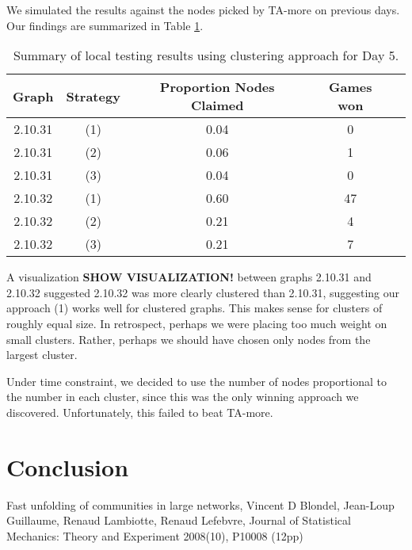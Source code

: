 \documentclass[letterpaper, 11pt]{article}
\begin{document}
We simulated the results against the nodes picked by TA-more on previous days. Our findings are summarized in Table \ref{table:day5}.
\begin{table}[h!]\centering
\begin{tabular}{ccccc}
Graph & Strategy & Proportion Nodes Claimed & Games won \\ \hline
\toprule
2.10.31 & (1) & 0.04 & 0 \\
2.10.31 & (2) & 0.06 & 1 \\
2.10.31 & (3) & 0.04 & 0 \\
\midrule

2.10.32 & (1) & 0.60 & 47 \\
2.10.32 & (2) & 0.21 & 4 \\
2.10.32 & (3) & 0.21 & 7 \\
\midrule
\bottomrule
\end{tabular}
\caption{Summary of local testing results using clustering approach for Day 5.}
\label{table:day5}
\end{table}

A visualization \textbf{SHOW VISUALIZATION!} between graphs 2.10.31 and 2.10.32 suggested 2.10.32 was more clearly clustered than 2.10.31, suggesting our approach (1) works well for clustered graphs. This makes sense for clusters of roughly equal size. In retrospect, perhaps we were placing too much weight on small clusters. Rather, perhaps we should have chosen only nodes from the largest cluster.
\par
Under time constraint, we decided to use the number of nodes proportional to the number in each cluster, since this was the only winning approach we discovered. Unfortunately, this failed to beat TA-more.


\section{Conclusion}


\newpage
\begin{thebibliography}{9}

Fast unfolding of communities in large networks, Vincent D Blondel, Jean-Loup Guillaume, Renaud Lambiotte, Renaud Lefebvre, Journal of Statistical Mechanics: Theory and Experiment 2008(10), P10008 (12pp)


\end{thebibliography}
\end{document}
